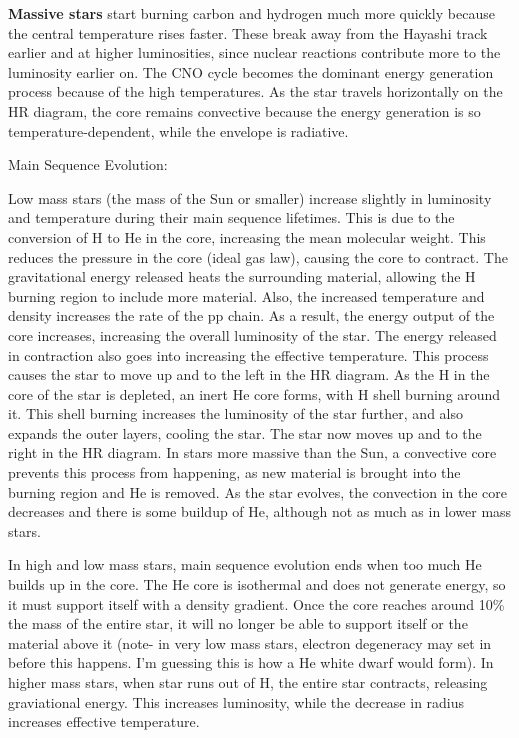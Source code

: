 \textbf{Massive stars} start burning carbon and hydrogen much more quickly because the central temperature rises faster. These break away from the Hayashi track earlier and at higher luminosities, since nuclear reactions contribute more to the luminosity earlier on. The CNO cycle becomes the dominant energy generation process because of the high temperatures. As the star travels horizontally on the HR diagram, the core remains convective because the energy generation is so temperature-dependent, while the envelope is radiative.

Main Sequence Evolution:

Low mass stars (the mass of the Sun or smaller) increase slightly in luminosity and temperature 
during their main sequence lifetimes.  This is due to the conversion of H to He in the core, 
increasing the mean molecular weight.  This reduces the pressure in the core (ideal gas law), 
causing the core to contract.  The gravitational energy released heats the surrounding material, 
allowing the H burning region to include more material.  Also, the increased temperature and 
density increases the rate of the pp chain.  As a result, the energy output of the core increases, 
increasing the overall luminosity of the star.  The energy released in contraction also goes 
into increasing the effective temperature.  This process causes the star to move up and to the 
left in the HR diagram.  As the H in the core of the star is depleted, an 
inert He core forms, with H shell burning around it.  This shell burning increases the luminosity 
of the star further, and also expands the outer layers, cooling the star.  The star now moves 
up and to the right in the HR diagram.  In stars more massive than the Sun, a convective 
core prevents this process from happening, as new material is brought into the burning region and 
He is removed.  As the star evolves, the convection in the core decreases and there is some 
buildup of He, although not as much as in lower mass stars.  

In high and low mass stars, main sequence evolution ends when too much He builds up in the core.  
The He core is isothermal and does not generate energy, so it must support itself with a density 
gradient.  Once the core reaches around 10\% the mass of the entire star, it will no longer 
be able to support itself or the material above it (note- in very low mass stars, electron 
degeneracy may set in before this happens.  I'm guessing this is how a He white dwarf would form). 
In higher mass stars, when star runs out of H, the entire star contracts, releasing graviational 
energy.  This increases luminosity, while the decrease in radius increases effective temperature.  


